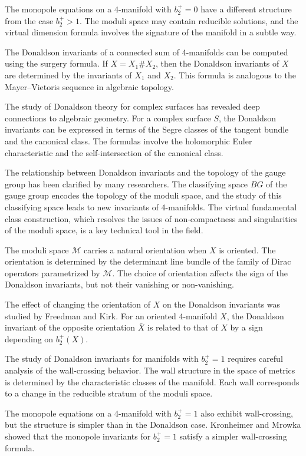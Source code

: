 The monopole equations on a 4-manifold with $b_2^+ = 0$ have a different structure from the case $b_2^+ > 1$. The moduli space may contain reducible solutions, and the virtual dimension formula involves the signature of the manifold in a subtle way.

The Donaldson invariants of a connected sum of 4-manifolds can be computed using the surgery formula. If $X = X_1 \# X_2$, then the Donaldson invariants of $X$ are determined by the invariants of $X_1$ and $X_2$. This formula is analogous to the Mayer--Vietoris sequence in algebraic topology.

The study of Donaldson theory for complex surfaces has revealed deep connections to algebraic geometry. For a complex surface $S$, the Donaldson invariants can be expressed in terms of the Segre classes of the tangent bundle and the canonical class. The formulas involve the holomorphic Euler characteristic and the self-intersection of the canonical class.

The relationship between Donaldson invariants and the topology of the gauge group has been clarified by many researchers. The classifying space $BG$ of the gauge group encodes the topology of the moduli space, and the study of this classifying space leads to new invariants of 4-manifolds. The virtual fundamental class construction, which resolves the issues of non-compactness and singularities of the moduli space, is a key technical tool in the field.

The moduli space $\mathcal{M}$ carries a natural orientation when $X$ is oriented. The orientation is determined by the determinant line bundle of the family of Dirac operators parametrized by $\mathcal{M}$. The choice of orientation affects the sign of the Donaldson invariants, but not their vanishing or non-vanishing.

The effect of changing the orientation of $X$ on the Donaldson invariants was studied by Freedman and Kirk. For an oriented 4-manifold $X$, the Donaldson invariant of the opposite orientation $\bar{X}$ is related to that of $X$ by a sign depending on $b_2^+(X)$.

The study of Donaldson invariants for manifolds with $b_2^+ = 1$ requires careful analysis of the wall-crossing behavior. The wall structure in the space of metrics is determined by the characteristic classes of the manifold. Each wall corresponds to a change in the reducible stratum of the moduli space.

The monopole equations on a 4-manifold with $b_2^+ = 1$ also exhibit wall-crossing, but the structure is simpler than in the Donaldson case. Kronheimer and Mrowka showed that the monopole invariants for $b_2^+ = 1$ satisfy a simpler wall-crossing formula.

